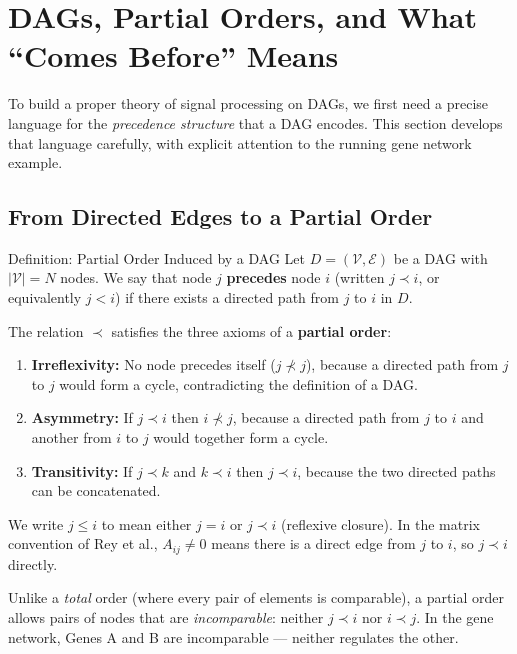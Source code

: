 \section{DAGs, Partial Orders, and What ``Comes Before'' Means}
\label{sec:dagcn_partial_order}

To build a proper theory of signal processing on DAGs, we first need a precise
language for the \emph{precedence structure} that a DAG encodes. This section
develops that language carefully, with explicit attention to the running gene
network example.

\subsection{From Directed Edges to a Partial Order}

\begin{mathbox}{Definition: Partial Order Induced by a DAG}
Let $D = (\mathcal{V}, \mathcal{E})$ be a DAG with $|\mathcal{V}| = N$ nodes.
We say that node $j$ \textbf{precedes} node $i$ (written $j \prec i$, or
equivalently $j < i$) if there exists a directed path from $j$ to $i$ in $D$.

The relation $\prec$ satisfies the three axioms of a \textbf{partial order}:
\begin{enumerate}[noitemsep]
    \item \textbf{Irreflexivity:} No node precedes itself ($j \not\prec j$),
          because a directed path from $j$ to $j$ would form a cycle, contradicting
          the definition of a DAG.
    \item \textbf{Asymmetry:} If $j \prec i$ then $i \not\prec j$, because a
          directed path from $j$ to $i$ and another from $i$ to $j$ would together
          form a cycle.
    \item \textbf{Transitivity:} If $j \prec k$ and $k \prec i$ then $j \prec i$,
          because the two directed paths can be concatenated.
\end{enumerate}

We write $j \le i$ to mean either $j = i$ or $j \prec i$ (reflexive closure).
In the matrix convention of Rey et al., $A_{ij} \neq 0$ means there is a direct
edge from $j$ to $i$, so $j \prec i$ directly.
\end{mathbox}

Unlike a \emph{total} order (where every pair of elements is comparable), a
partial order allows pairs of nodes that are \emph{incomparable}: neither
$j \prec i$ nor $i \prec j$. In the gene network, Genes A and B are
incomparable --- neither regulates the other.

